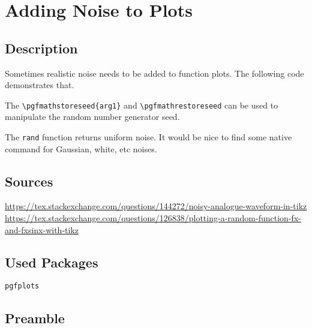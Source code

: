 \documentclass{article}
\makeatletter
\def\pgfmathstoreseed#1{\let#1\pgfmath@rnd@z}
\let\pgfmathrestoreseed\pgfmathsetseed
\makeatother
\begin{document}
\section*{Adding Noise to Plots}

\subsection*{Description}
Sometimes realistic noise needs to be added to function plots. The following code demonstrates that.

The \verb|\pgfmathstoreseed{arg1}| and \verb|\pgfmathrestoreseed| can be used to manipulate the random number generator seed.

The \verb|rand| function returns uniform noise. It would be nice to find some native command for Gaussian, white, etc noises.

\subsection*{Sources}
\url{https://tex.stackexchange.com/questions/144272/noisy-analogue-waveform-in-tikz}\\
\url{https://tex.stackexchange.com/questions/126838/plotting-a-random-function-fx-and-fxsinx-with-tikz}

\subsection*{Used Packages}
\verb|pgfplots|

\subsection*{Preamble}
\begin{latex}
\usepackage{pgfplots}

\makeatletter
\def\pgfmathstoreseed#1{\let#1\pgfmath@rnd@z}
\let\pgfmathrestoreseed\pgfmathsetseed
\makeatother
\end{latex}
\end{document}
